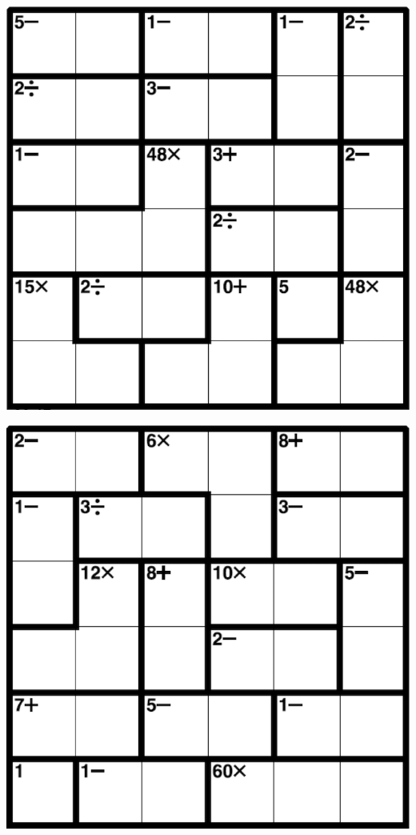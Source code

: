 
\includegraphics[scale=1]{Gambar/Lampiran/6x6_21.png}

\includegraphics[scale=1]{Gambar/Lampiran/6x6_22.png}
